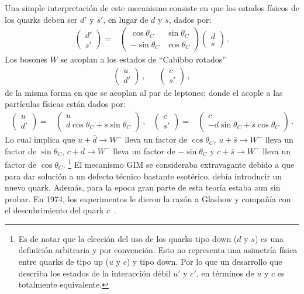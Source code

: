 Una simple interpretación de este mecanismo consiste en que los estados físicos de los quarks deben ser $d'$ y $s'$, en lugar de  $d$ y $s$, dados por:
%
\begin{align}\label{Eq:Rot}
\begin{pmatrix}d' \\ s' \end{pmatrix} =& \begin{pmatrix}\cos \theta_C & \sin \theta_C \\ -\sin \theta_C & \cos \theta_C \end{pmatrix}\begin{pmatrix}d \\ s \end{pmatrix} \,.
\end{align}
%
Los bosones $W$ se acoplan a los estados de “Cabibbo rotados”
%
\begin{align*}
\begin{pmatrix}u \\ d' \end{pmatrix}\,, & 
&\begin{pmatrix}c \\ s' \end{pmatrix}\,,
\end{align*}
%
de la misma forma en que se acoplan al par de leptones; donde el acople a las partículas físicas están dados por:
%
\begin{align*}
\begin{pmatrix}u \\ d' \end{pmatrix} =& \begin{pmatrix}u \\ d\cos \theta_C + s \sin \theta_C \end{pmatrix}\,, & 
\begin{pmatrix}c \\ s' \end{pmatrix} =& \begin{pmatrix}c \\ -d\sin \theta_C + s \cos \theta_C \end{pmatrix}\,.
\end{align*}
%
Lo cual implica que $u + \bar{d} \to W^{-}$ lleva un factor de $\cos \theta_C$, $u + \bar{s} \to W^{-}$ lleva un factor de $\sin \theta_C$, $c + \bar{d} \to W^{-}$ lleva un factor de $-\sin \theta_C$ y $c + \bar{s} \to W^{-}$ lleva un factor de $\cos \theta_C$. \footnote{Es de notar que la elección del uso de los quarks tipo down ($d$ y $s$) es una definición arbitraria y por convención. Esto no representa una asimetría física entre quarks de tipo up ($u$ y $c$) y tipo down. Por lo que un desarrollo que  describa los estados de la interacción débil $u'$ y $c'$, en términos de $u$ y $c$ es totalmente equivalente.} El mecanismo GIM se consideraba extravagante debido a que para dar solución a un defecto técnico bastante esotérico, debía introducir un nuevo quark. Además,  para la epoca gran parte de esta teoría estaba aun sin probar. En 1974, los experimentos le dieron la razón a Glashow y compañía con el descubrimiento del quark $c$~\cite{Aubert:1974js}. 

